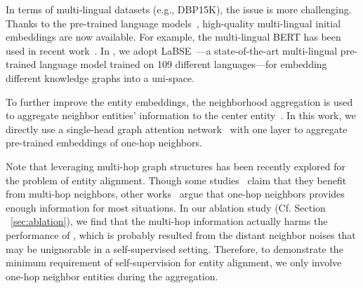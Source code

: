 In terms of multi-lingual datasets (e.g., DBP15K), the issue is more challenging. 
Thanks to the pre-trained language models~\cite{han2021pre}, high-quality multi-lingual initial embeddings are now available. For example, the multi-lingual BERT has been used in recent work~\cite{zhang2019multi,tang2019bert-int}. In \solution, we adopt LaBSE~\cite{feng2020language}---a state-of-the-art multi-lingual pre-trained language model trained on 109 different languages---for embedding different knowledge graphs into a uni-space. 




To further improve the entity embeddings, 
the neighborhood aggregation is used to aggregate neighbor entities' information to the center entity~\cite{GCN-Align,xu2019cross-lingual}. 
In this work, we directly use a single-head graph attention network~\cite{velivckovic2017graph} with one layer to aggregate pre-trained embeddings of one-hop neighbors.

Note that leveraging multi-hop graph structures has been recently explored for the problem of entity alignment. 
Though some studies~\cite{fey2020deep,wu2019relation,GCN-Align} claim that they benefit from multi-hop neighbors, other works~\cite{xu2019cross-lingual,zhang2018mego2vec} argue that one-hop neighbors provides enough information for most situations. 
In our ablation study (Cf. Section ~\ref{sec:ablation}), we find that the multi-hop information actually harms the performance of \solution, which is probably resulted from the distant neighbor noises that may be unignorable in a self-supervised setting. 
Therefore, to demonstrate the minimum requirement of self-supervision for entity alignment, we only involve one-hop neighbor entities during the aggregation. %




